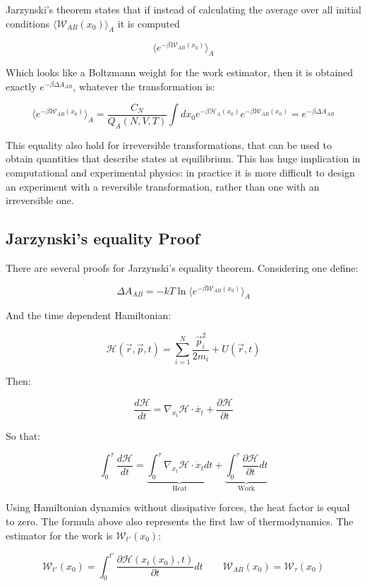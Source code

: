 Jarzynski's theorem states that if instead of calculating the average over all initial conditions $\langle\mathcal{W}_{AB}(x_0)\rangle_A$ it is computed

$$\langle e^{-\beta\mathcal{W}_{AB}(x_0)}\rangle_A$$

Which looks like a Boltzmann weight for the work estimator, then it is obtained exactly $e^{-\beta\Delta A_{AB}}$, whatever the transformation is:

$$\langle e^{-\beta\mathcal{W}_{AB}(x_0)}\rangle_A = \frac{C_N}{Q_A(N, V, T)}\int dx_0e^{-\beta\mathcal{H}_A(x_0)}e^{-\beta\mathcal{W}_{AB}(x_0)} = e^{-\beta\Delta A_{AB}}$$

This equality also hold for irreversible transformations, that can be used to obtain quantities that describe states at equilibrium.
This has huge implication in computational and experimental physics: in practice it is more difficult to design an experiment with a reversible transformation, rather than one with an irreversible one.

	\subsection{Jarzynski's equality Proof}
	There are several proofs for Jarzynski's equality theorem.
	Considering one define:

	$$\Delta A_{AB} = -kT\ln\langle e^{-\beta\mathcal{W}_{AB}(x_0)}\rangle_A$$

	And the time dependent Hamiltonian:

	$$\mathcal{H}(\vec{r}, \vec{p}, t) = \sum\limits_{i=1}^N\frac{\vec{p}_i^2}{2m_i} + U(\vec{r}, t)$$

	Then:

	$$\frac{d\mathcal{H}}{dt} = \nabla_{x_t}\mathcal{H}\cdot\dot{x_t}+\frac{\partial\mathcal{H}}{\partial t}$$

	So that:

	$$\int_0^\tau\frac{d\mathcal{H}}{dt} = \underbrace{\int_0^\tau\nabla_{x_t}\mathcal{H}\cdot\dot{x}_tdt}_{\text{Heat}}+\underbrace{\int_0^\tau\frac{\partial\mathcal{H}}{\partial t}dt}_{\text{Work}}$$

	Using Hamiltonian dynamics without dissipative forces, the heat factor is equal to zero.
	The formula above also represents the first law of thermodynamics.
	The estimator for the work is $\mathcal{W}_{t'}(x_0)$:

	$$\mathcal{W}_{t'}(x_0) = \int_0^{t'}\frac{\partial\mathcal{H}(x_t(x_0), t)}{\partial t}dt\qquad \mathcal{W}_{AB}(x_0) = \mathcal{W}_\tau(x_0)$$

